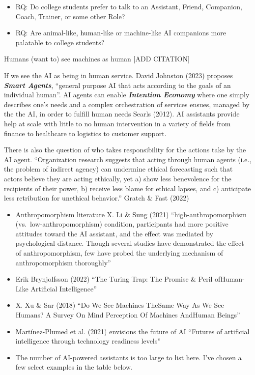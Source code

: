 \documentclass[
  letterpaper,
  DIV=11,
  numbers=noendperiod]{scrartcl}
\providecommand{\tightlist}{%
  \setlength{\itemsep}{0pt}\setlength{\parskip}{0pt}}\usepackage{longtable,booktabs,array}
\begin{document}
\begin{itemize}
\item
  RQ: Do college students prefer to talk to an Assistant, Friend,
  Companion, Coach, Trainer, or some other Role?
\item
  RQ: Are animal-like, human-like or machine-like AI companions more
  palatable to college students?
\end{itemize}

Humans (want to) see machines as human {[}ADD CITATION{]}

If we see the AI as being in human service. David Johnston (2023)
proposes \textbf{\emph{Smart Agents}}, ``general purpose AI that acts
according to the goals of an individual human''. AI agents can enable
\textbf{\emph{Intention Economy}} where one simply describes one's needs
and a complex orchestration of services ensues, managed by the the AI,
in order to fulfill human needs Searls (2012). AI assistants provide
help at scale with little to no human intervention in a variety of
fields from finance to healthcare to logistics to customer support.

There is also the question of who takes responsibility for the actions
take by the AI agent. ``Organization research suggests that acting
through human agents (i.e., the problem of indirect agency) can
undermine ethical forecasting such that actors believe they are acting
ethically, yet a) show less benevolence for the recipients of their
power, b) receive less blame for ethical lapses, and c) anticipate less
retribution for unethical behavior.'' Gratch \& Fast (2022)

\begin{itemize}
\tightlist
\item
  Anthropomorphism literature X. Li \& Sung (2021)
  ``high-anthropomorphism (vs.~low-anthropomorphism) condition,
  participants had more positive attitudes toward the AI assistant, and
  the effect was mediated by psychological distance. Though several
  studies have demonstrated the effect of anthropomorphism, few have
  probed the underlying mechanism of anthropomorphism thoroughly''
\item
  Erik Brynjolfsson (2022) ``The Turing Trap: The Promise \& Peril
  ofHuman-Like Artificial Intelligence''
\item
  X. Xu \& Sar (2018) ``Do We See Machines TheSame Way As We See Humans?
  A Survey On Mind Perception Of Machines AndHuman Beings''
\item
  Martínez-Plumed et al. (2021) envisions the future of AI ``Futures of
  artificial intelligence through technology readiness levels''
\item
  The number of AI-powered assistants is too large to list here. I've
  chosen a few select examples in the table below.
\end{itemize}
\end{document}
